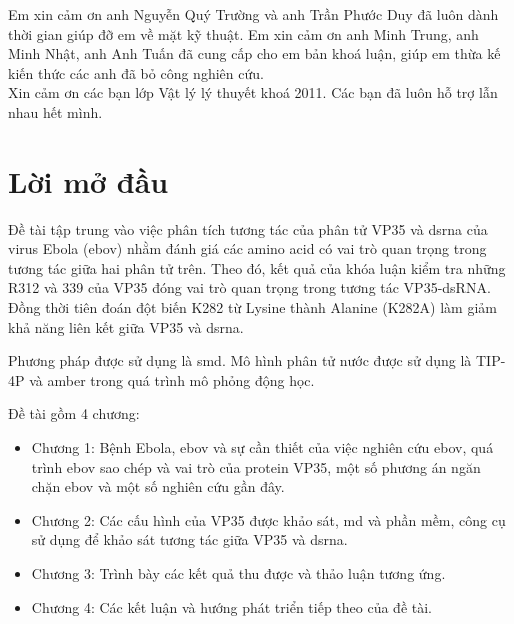 \documentclass[12pt,a4paper,reqno, oneside]{book}
\begin{document}
Em xin cảm ơn anh Nguyễn Quý Trường và anh Trần Phước Duy đã luôn dành thời gian giúp đỡ em về mặt kỹ thuật. Em xin cảm ơn anh Minh Trung, anh Minh Nhật, anh Anh Tuấn đã cung cấp cho em bản khoá luận, giúp em thừa kế kiến thức các anh đã bỏ công nghiên cứu.\\

Xin cảm ơn các bạn lớp Vật lý lý thuyết khoá 2011. Các bạn đã luôn hỗ trợ lẫn nhau hết mình.

\printglossaries
{}
\clearpage

\newpage
\pagestyle{fancy}
\listoffigures




\newpage
{}
\chapter*{Lời mở đầu}
	Đề tài tập trung vào việc phân tích tương tác của phân tử VP35 và \gls{dsrna} của virus Ebola (\gls{ebov}) nhằm đánh giá các amino acid có vai trò quan trọng trong tương tác giữa hai phân tử trên. Theo đó, kết quả của khóa luận kiểm tra những R312 và 339 của VP35 đóng vai trò quan trọng trong tương tác VP35-dsRNA\cite{Leung2010}. Đồng thời tiên đoán đột biến K282 từ Lysine thành Alanine (K282A) làm giảm khả năng liên kết giữa VP35 và \gls{dsrna}.
	
	Phương pháp được sử dụng là \gls{smd}. Mô hình phân tử nước được sử dụng là TIP-4P\cite{Horn2004} và \gls{amber}\cite{Hornak2006} trong quá trình mô phỏng động học.
	
	Đề tài gồm 4 chương:
	\begin{itemize}
	\item Chương 1: Bệnh Ebola, \gls{ebov} và sự cần thiết của việc nghiên cứu \gls{ebov}, quá trình \gls{ebov} sao chép và vai trò của protein VP35, một số phương án ngăn chặn \gls{ebov} và một số nghiên cứu gần đây.
	\item Chương 2: Các cấu hình của VP35 được khảo sát, \gls{md} và phần mềm, công cụ sử dụng để khảo sát tương tác giữa VP35 và \gls{dsrna}.
	\item Chương 3: Trình bày các kết quả thu được và thảo luận tương ứng.
	\item Chương 4: Các kết luận và hướng phát triển tiếp theo của đề tài.
	\end{itemize}
\end{document}
